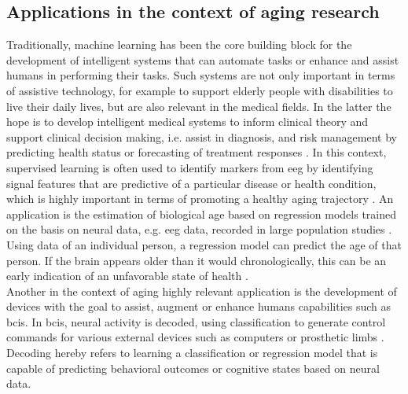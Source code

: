 \subsection{Applications in the context of aging research}
Traditionally, machine learning has been the core building block for the development of intelligent systems that can automate tasks or enhance and assist humans in performing their tasks. Such systems are not only important in terms of assistive technology, for example to support elderly people with disabilities to live their daily lives, but are also relevant in the medical fields. In the latter the hope is to develop intelligent medical systems to inform clinical theory and support clinical decision making, i.e. assist in diagnosis, and risk management by predicting health status or forecasting of treatment responses \cite{Woo2017}. In this context, supervised learning is often used to identify markers from \gls{eeg} by identifying signal features that are predictive of a particular disease or health condition, which is highly important in terms of promoting a healthy aging trajectory \cite{Babiloni_AlzCons2021,Mei2021}. An application is the estimation of biological age based on regression models trained on the basis on neural data, e.g. \gls{eeg} data, recorded in large population studies \cite{Engemann2022}. Using data of an individual person, a regression model can predict the age of that person. If the brain appears older than it would chronologically, this can be an early indication of an unfavorable state of health \cite{Gonneaud2021}.\\
Another in the context of aging highly relevant application is the development of devices with the goal to assist, augment or enhance humans capabilities such as \glspl{bci}. In \glspl{bci}, neural activity is decoded, using classification to generate control commands for various external devices such as computers or prosthetic limbs \cite{Saha2021, Anumanchipalli2019}. Decoding hereby refers to learning a classification or regression model that is capable of predicting behavioral outcomes or cognitive states based on neural data.\\
\\
